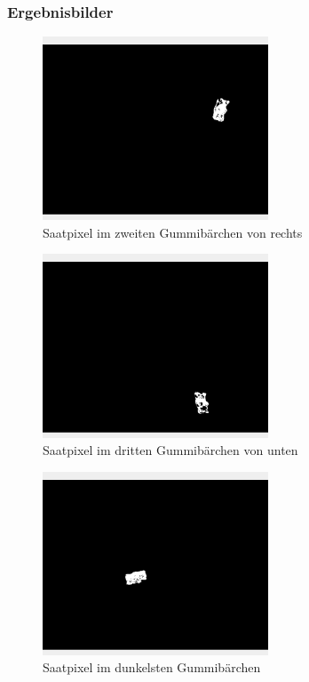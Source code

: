 \documentclass[12pt]{article}
\begin{document}
\subsubsection*{Ergebnisbilder}
\begin{figure}[H]
  \centering
  \includegraphics[width=0.6\textwidth, keepaspectratio]{region_growing_1.png}\\
  Saatpixel im zweiten Gummibärchen von rechts
\end{figure}
\begin{figure}[H]
  \centering
  \includegraphics[width=0.6\textwidth, keepaspectratio]{region_growing_2.png}\\
  Saatpixel im dritten Gummibärchen von unten
\end{figure}
\begin{figure}[H]
  \centering
  \includegraphics[width=0.6\textwidth, keepaspectratio]{region_growing_3.png}\\
  Saatpixel im dunkelsten Gummibärchen
\end{figure}
\end{document}

